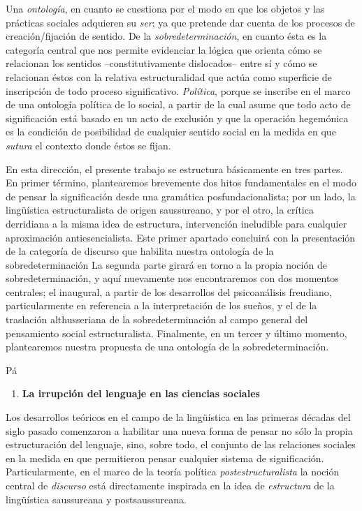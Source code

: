 Una \emph{ontología}, en cuanto se cuestiona por el modo en que los objetos y las prácticas sociales adquieren su \emph{ser}; ya que pretende dar cuenta de los procesos de creación/fijación de sentido. De la \emph{sobredeterminación}, en cuanto ésta es la categoría central que nos permite evidenciar la lógica que orienta cómo se relacionan los sentidos --constitutivamente dislocados-- entre sí y cómo se relacionan éstos con la relativa estructuralidad que actúa como superficie de inscripción de todo proceso significativo. \emph{Política}, porque se inscribe en el marco de una ontología política de lo social, a partir de la cual asume que todo acto de significación está basado en un acto de exclusión y que la operación hegemónica es la condición de posibilidad de cualquier sentido social en la medida en que \emph{sutura} el contexto donde éstos se fijan.

En esta dirección, el presente trabajo se estructura básicamente en tres partes. En primer término, plantearemos brevemente dos hitos fundamentales en el modo de pensar la significación desde una gramática posfundacionalista; por un lado, la lingüística estructuralista de origen saussureano, y por el otro, la crítica derridiana a la misma idea de estructura, intervención ineludible para cualquier aproximación antiesencialista. Este primer apartado concluirá con la presentación de la categoría de discurso que habilita nuestra ontología de la sobredeterminación La segunda parte girará en torno a la propia noción de sobredeterminación, y aquí nuevamente nos encontraremos con dos momentos centrales; el inaugural, a partir de los desarrollos del psicoanálisis freudiano, particularmente en referencia a la interpretación de los sueños, y el de la traslación althusseriana de la sobredeterminación al campo general del pensamiento social estructuralista. Finalmente, en un tercer y último momento, plantearemos nuestra propuesta de una ontología de la sobredeterminación.

Pá

\begin{enumerate}
\def\labelenumi{\arabic{enumi}.}
\item
  \textbf{La irrupción del lenguaje en las ciencias sociales}
\end{enumerate}

Los desarrollos teóricos en el campo de la lingüística en las primeras décadas del siglo pasado comenzaron a habilitar una nueva forma de pensar no sólo la propia estructuración del lenguaje, sino, sobre todo, el conjunto de las relaciones sociales en la medida en que permitieron pensar cualquier sistema de significación. Particularmente, en el marco de la teoría política \emph{postestructuralista} la noción central de \emph{discurso} está directamente inspirada en la idea de \emph{estructura} de la lingüística saussureana y postsaussureana.

